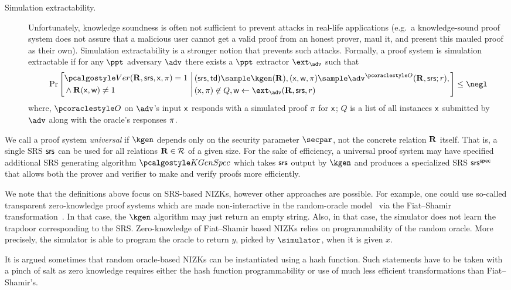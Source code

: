 \documentclass[runningheads,10pt]{llncs}
\numberwithin{equation}{section}
\begin{document}
\begin{description}
\item[{Simulation extractability.}]
Unfortunately, knowledge soundness is often not sufficient to prevent attacks
in real-life applications (e.g.~a knowledge-sound proof system does not assure
that a malicious user cannot get a valid proof from an honest prover, maul it,
and present this mauled proof as their own). Simulation extractability is a
stronger notion that prevents such attacks. Formally, a proof system is
simulation extractable if for any $\ppt$ adversary $\adv$ there exists a $\ppt$
extractor $\ext_\adv$ such that
\[
\Pr
\left[
\begin{aligned}
& \verifier(\REL, \srs, \inp, \zkproof) = 1 \\
& \land \REL(\inp, \wit) \neq 1
\end{aligned}
\,\left | \,
\begin{aligned}
& (\srs, \td) \sample \kgen(\REL), (\inp, \wit, \zkproof) \sample
\adv^{\oracleo}(\REL, \srs; r), \\
& (\inp, \zkproof) \not\in Q, \wit \gets \ext_\adv(\REL, \srs, r)
\end{aligned}
\right.
\right]
\leq \negl
\]
where, $\oracleo$ on $\adv$'s input $\mathsf{x}$ responds with a simulated proof
$\mathsf{\pi}$ for $\mathsf{x}$; $Q$ is a list of all instances $\mathsf{x}$ submitted by $\adv$
along with the oracle's responses $\mathsf{\pi}$.
\end{description}

We call a proof system \emph{universal} if $\kgen$ depends only on the security
parameter $\secpar$, not the concrete relation $\mathbf{R}$ itself. That is, a single
SRS $\mathsf{srs}$ can be used for all relations $\mathbf{R} \in \mathcal{R}$ of a given
size. For the sake of efficiency, a universal proof system may have specified
additional SRS generating algorithm $\kgens$ which takes $\mathsf{srs}$ output by
$\kgen$ and produces a specialized SRS $\mathsf{srs}^{\mathsf{spec}}$ that allows both the prover and
verifier to make and verify proofs more efficiently.

\begin{remark}
We note that the definitions above focus on SRS-based NIZKs, however other
approaches are possible. For example, one could use so-called transparent
zero-knowledge proof systems which are made non-interactive in the
random-oracle model~\cite{CCS:BelRog93} via the Fiat--Shamir
transformation~\cite{C:FiaSha86}. In that case, the $\kgen$ algorithm may just
return an empty string. Also, in that case, the simulator does not learn the
trapdoor corresponding to the SRS. Zero-knowledge of Fiat--Shamir based NIZKs
relies on programmability of the random oracle. More precisely, the simulator
is able to program the oracle to return $y$, picked by $\simulator$, when it is
given $x$.

It is argued sometimes that random oracle-based NIZKs can be instantiated using
a hash function. Such statements have to be taken with a pinch of salt as zero
knowledge requires either the hash function programmability or use of much less
efficient transformations than Fiat--Shamir's.
\end{remark}
\end{document}
